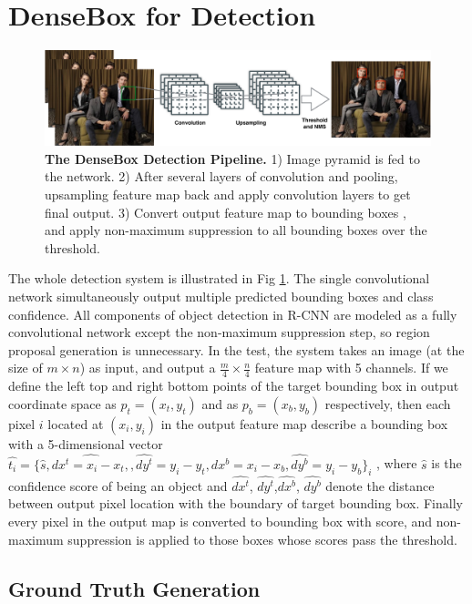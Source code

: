  
\section{DenseBox for Detection }
\label{sec:model} 
	\begin{figure}[!hbtp]
	\centering
	 \includegraphics[scale=0.39]{figures/figure1-crop.pdf}
	\caption{\textbf{The DenseBox Detection Pipeline.} 1) Image pyramid is fed to the network. 2) After several layers of convolution and pooling, upsampling feature map back and apply convolution layers to get final output. 3) Convert output feature map to bounding boxes , and apply non-maximum suppression to all bounding boxes over the threshold. }
	\label{fig:fig_overview}
	\end{figure}


The whole detection system is illustrated in Fig \ref{fig:fig_overview}. The single convolutional network simultaneously output multiple predicted bounding boxes and class confidence. All components of object detection in R-CNN are modeled as a fully convolutional network except the non-maximum suppression step, so region proposal generation is unnecessary. In the test, the system takes an image (at the size of $m\times n$) as input, and output a $ \frac{m}{4} \times \frac{n}{4} $ feature map with 5 channels.
If we define the left top and right bottom points of the target bounding box in output coordinate space as $ p_t = (x_t, y_t)$ and as $ p_b = (x_b, y_b)$ respectively, then each pixel $i$ located at $(x_i, y_i)$ in the output feature map describe a bounding box with a 5-dimensional vector $\hat{t_i } = \{ \hat{s }, \hat{dx^{t}= x_i - x_t,},\hat{dy^{t}} = y_i - y_t,\hat{dx^{b}}= x_i - x_b,\hat{dy^{b}}= y_i - y_b \}_i$ , where $\hat{s }$ is the confidence score of being an object and $\hat{dx^{t}}$, $\hat{dy^{t}}$,$\hat{dx^{b}}$, $\hat{dy^{b}}$ denote the distance between output pixel location with the boundary of target bounding box. Finally every pixel in the output map is converted to bounding box with score, and non-maximum suppression is applied to those boxes whose scores pass the threshold. 

\subsection{Ground Truth Generation } 

